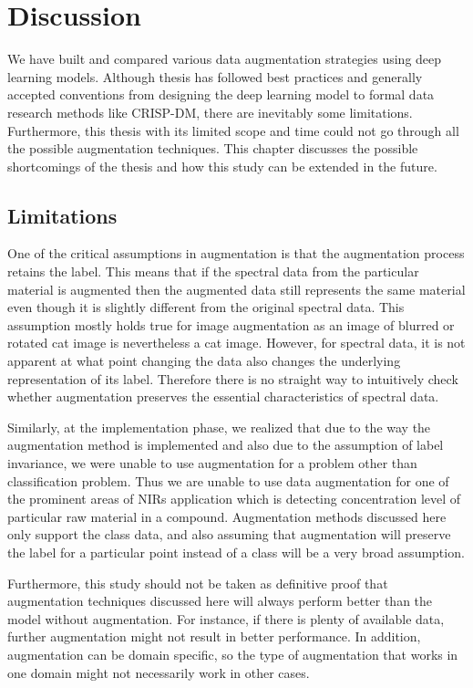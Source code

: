 \chapter{Discussion}
\label{chapter:discussion}

We have built and compared various data augmentation strategies using deep learning models. Although thesis has followed best practices and generally accepted conventions from designing the deep learning model to formal data research methods like CRISP-DM, there are inevitably some limitations. Furthermore, this thesis with its limited scope and time could not go through all the possible augmentation techniques.   This chapter discusses the possible shortcomings of the thesis and how this study can be extended in the future.


\section{Limitations}

One of the critical assumptions in augmentation is that the augmentation process retains the label. This means that if the spectral data from the particular material is augmented then the augmented data still represents the same material even though it is slightly different from the original spectral data. This assumption mostly holds true for image augmentation as an image of blurred or rotated cat image is nevertheless a cat image. However, for spectral data, it is not apparent at what point changing the data also changes the underlying representation of its label. Therefore there is no straight way to intuitively check whether augmentation preserves the essential characteristics of spectral data.

Similarly, at the implementation phase, we realized that due to the way the augmentation method is implemented and also due to the assumption of label invariance, we were unable to use augmentation for a problem other than classification problem. Thus we are unable to use data augmentation for one of the prominent areas of NIRs application which is detecting concentration level of particular raw material in a compound. Augmentation methods discussed here only support the class data, and also assuming that augmentation will preserve the label for a particular point instead of a class will be a very broad assumption.

Furthermore, this study should not be taken as definitive proof that augmentation techniques discussed here will always perform better than the model without augmentation. For instance, if there is plenty of available data, further augmentation might not result in better performance. In addition, augmentation can be domain specific, so the type of augmentation that works in one domain might not necessarily work in other cases. 

